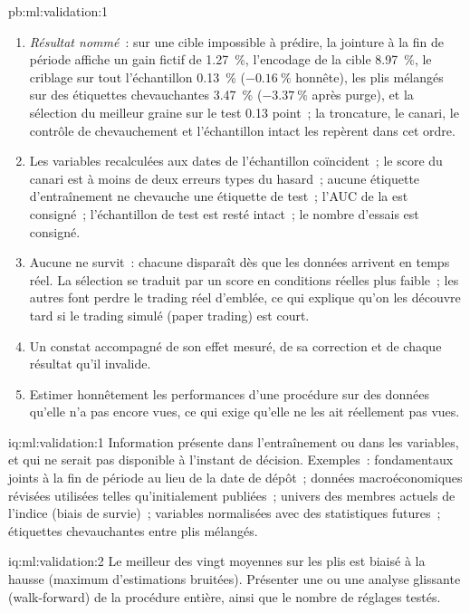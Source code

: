 \begin{solution}{pb:ml:validation:1}
\begin{enumerate}
d'entraînement.
\item \emph{Résultat nommé}~: sur une cible impossible à prédire, la jointure à la fin de période affiche un gain fictif de 1.27~\%, l'encodage de la cible 8.97~\%,
le criblage sur tout l'échantillon 0.13~\% ($-0.16~\%$ honnête), les plis mélangés sur des étiquettes chevauchantes 3.47~\% ($-3.37~\%$ après purge), et
la sélection du meilleur graine sur le test 0.13 point~; la troncature, le canari, le contrôle de chevauchement et l'échantillon intact les repèrent dans cet ordre.
\item Les variables recalculées aux dates de l'échantillon coïncident~; le score du canari est à moins de deux erreurs types du hasard~; aucune
étiquette d'entraînement ne chevauche une étiquette de test~; l'AUC de la  est consigné~; l'échantillon de test est resté intact~; le nombre d'essais est consigné.
\item Aucune ne survit~: chacune disparaît dès que les données arrivent en temps réel. La sélection se traduit par un score en conditions réelles plus faible~;
les autres font perdre le trading réel d'emblée, ce qui explique qu'on les découvre tard si le trading simulé (paper trading) est court.
\item Un constat accompagné de son effet mesuré, de sa correction et de chaque résultat qu'il invalide.
\item Estimer honnêtement les performances d'une procédure sur des données qu'elle n'a pas encore vues, ce qui exige qu'elle ne les ait réellement pas
vues.
\end{enumerate}
\end{solution}

\begin{solution}{iq:ml:validation:1}
Information présente dans l'entraînement ou dans les variables, et qui ne serait pas disponible à l'instant de décision. Exemples~: fondamentaux joints à la fin de
période au lieu de la date de dépôt~; données macroéconomiques révisées utilisées telles qu'initialement publiées~; univers des membres actuels de l'indice
(biais de survie)~; variables normalisées avec des statistiques futures~; étiquettes chevauchantes entre plis mélangés.
\end{solution}

\begin{solution}{iq:ml:validation:2}
Le meilleur des vingt moyennes sur les plis est biaisé à la hausse (maximum d'estimations bruitées). Présenter une  ou une
analyse glissante (walk-forward) de la procédure entière, ainsi que le nombre de réglages testés.
\end{solution}

